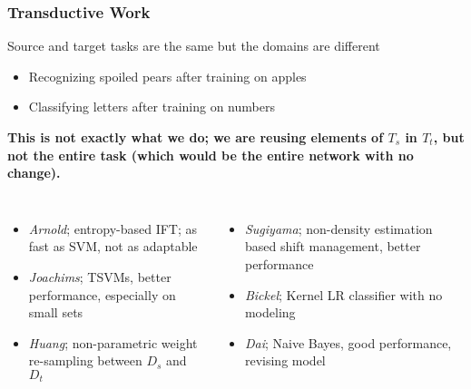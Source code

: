 \documentclass[t,handout]{beamer}
\begin{document}
\begin{frame}
\frametitle{Transductive Work}
Source and target tasks are the same but the domains are different
\begin{itemize}
\item Recognizing spoiled pears after training on apples
\item Classifying letters after training on numbers
\end{itemize}
\textbf{This is not exactly what we do; we are reusing elements of $T_{s}$ in $T_{t}$, but not the entire task (which would be the entire network with no change).}
~\\
\begin{columns}
\footnotesize{
\begin{itemize}
\item \textit{Arnold}; entropy-based IFT; as fast as SVM, not as adaptable
\item \textit{Joachims}; TSVMs, better performance, especially on small sets
\item \textit{Huang}; non-parametric weight re-sampling between $D_{s}$ and $D_{t}$
\end{itemize}
}

\footnotesize{
\begin{itemize}
\item \textit{Sugiyama}; non-density estimation based shift management, better performance
\item \textit{Bickel}; Kernel LR classifier with no modeling
\item \textit{Dai}; Naive Bayes, good performance, revising model
\end{itemize}
}

\end{columns}

\end{frame}
\end{document}
